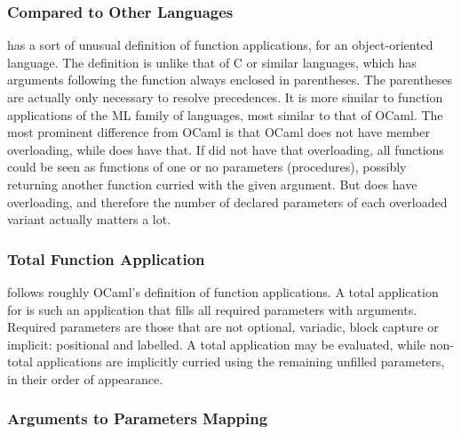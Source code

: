 \subsubsection{Compared to Other Languages}

\Aml has a sort of unusual definition of function applications, for an object-oriented language. The definition is unlike that of C or similar languages, which has arguments following the function always enclosed in parentheses. The parentheses are actually only necessary to resolve precedences. It is more similar to function applications of the ML family of languages, most similar to that of OCaml. The most prominent difference from OCaml is that OCaml does not have member overloading, while \Aml does have that. If \Aml did not have that overloading, all functions could be seen as functions of one or no parameters (procedures), possibly returning another function curried with the given argument. But \Aml does have overloading, and therefore the number of declared parameters of each overloaded variant actually matters a lot. 





\subsubsection{Total Function Application}

\Aml follows roughly OCaml's definition of function applications. A total application for \Aml is such an application that fills all required parameters with arguments. Required parameters are those that are not optional, variadic, block capture or implicit: positional and labelled. A total application may be evaluated, while non-total applications are implicitly curried using the remaining unfilled parameters, in their order of appearance. 







\subsubsection{Arguments to Parameters Mapping}

